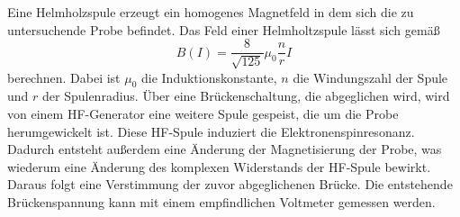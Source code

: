 Eine Helmholzspule erzeugt ein homogenes Magnetfeld in dem sich die zu untersuchende Probe befindet.
Das Feld einer Helmholtzspule lässt sich gemäß
\begin{equation}
  B(I) = \frac{8}{\sqrt{125}}\mu_0\frac{n}{r}I
  \label{eqn:B}
\end{equation}
berechnen.
Dabei ist $\mu_0$ die Induktionskonstante, $n$ die Windungszahl der Spule und $r$ der Spulenradius.
Über eine Brückenschaltung, die abgeglichen wird, wird von einem HF-Generator eine weitere Spule gespeist, die um die Probe herumgewickelt ist.
Diese HF-Spule induziert die Elektronenspinresonanz.
Dadurch entsteht außerdem eine Änderung der Magnetisierung der Probe, was wiederum eine Änderung des komplexen Widerstands der HF-Spule bewirkt.
Daraus folgt eine Verstimmung der zuvor abgeglichenen Brücke.
Die entstehende Brückenspannung kann mit einem empfindlichen Voltmeter gemessen werden.
